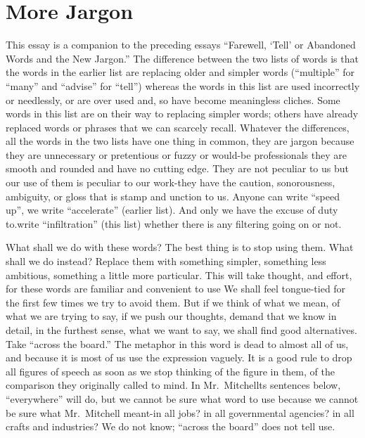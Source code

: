 \documentclass[
    oneside,
    11pt,
]{memoir}
\begin{document}
\chapter{More Jargon}
This essay is a companion to the preceding essays \enquote{Farewell, \enquote{Tell} or Abandoned Words and the New Jargon.} The difference between the two lists of words is that the words in the earlier list are replacing older and simpler words (\enquote{multiple} for \enquote{many} and \enquote{advise} for \enquote{tell}) whereas the words in this list are used incorrectly or needlessly, or are over used and, so have become meaningless cliches. Some words in this list are on their way to replacing simpler words; others have already replaced words or phrases that we can scarcely recall. Whatever the differences, all the words in the two lists have one thing in common, they are jargon because they are unnecessary or pretentious or fuzzy or would-be professionals they are smooth and rounded and have no cutting edge. They are not peculiar to us but our use of them is peculiar to our work-they have the caution, sonorousness, ambiguity, or gloss that is stamp and unction to us. Anyone can write \enquote{speed up}, we write \enquote{accelerate} (earlier list). And only we have the excuse of duty to.write \enquote{infiltration} (this list) whether there is any filtering going on or not.

What shall we do with these words? The best thing is to stop using them. What shall we do instead? Replace them with something simpler, something less ambitious, something a little more particular. This will take thought, and effort, for these words are familiar and convenient to use We shall feel tongue-tied for the first few times we try to avoid them. But if we think of what we mean, of what we are trying to say, if we push our thoughts, demand that we know in detail, in the furthest sense, what we want to say, we shall find good alternatives. Take \enquote{across the board.} The metaphor in this word is dead to almost all of us, and because it is most of us use the expression vaguely. It is a good rule to drop all figures of speech as soon as we stop thinking of the figure in them, of the comparison they originally called to mind. In Mr.\ Mitchellts sentences below, \enquote{everywhere} will do, but we cannot be sure what word to use because we cannot be sure what Mr.\ Mitchell meant-in all jobs? in all governmental agencies? in all crafts and industries? We do not know; \enquote{across the board} does not tell use.
\end{document}
